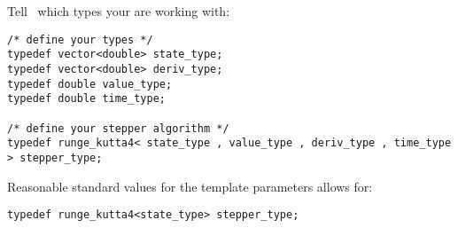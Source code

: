 
\begin{frame}[fragile]

Tell \odeint\ which types your are working with:

\begin{lstlisting}
/* define your types */
typedef vector<double> state_type;
typedef vector<double> deriv_type;
typedef double value_type;
typedef double time_type;

/* define your stepper algorithm */
typedef runge_kutta4< state_type , value_type , deriv_type , time_type > stepper_type;
\end{lstlisting}

Reasonable standard values for the template parameters allows for:

\begin{lstlisting}
typedef runge_kutta4<state_type> stepper_type;
\end{lstlisting}


\end{frame}




